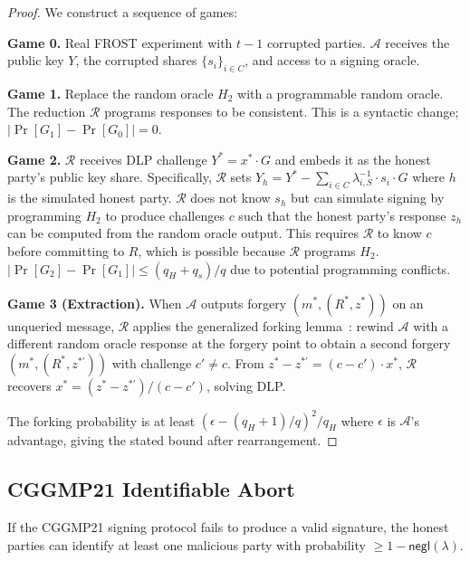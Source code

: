 \begin{proof}
We construct a sequence of games:

\textbf{Game 0.} Real FROST experiment with $t-1$ corrupted parties. $\mathcal{A}$
receives the public key $Y$, the corrupted shares $\{s_i\}_{i \in C}$, and access
to a signing oracle.

\textbf{Game 1.} Replace the random oracle $H_2$ with a programmable random oracle.
The reduction $\mathcal{R}$ programs responses to be consistent. This is a syntactic
change; $|\Pr[G_1] - \Pr[G_0]| = 0$.

\textbf{Game 2.} $\mathcal{R}$ receives DLP challenge $Y^* = x^* \cdot G$ and
embeds it as the honest party's public key share. Specifically, $\mathcal{R}$ sets
$Y_h = Y^* - \sum_{i \in C} \lambda_{i,S}^{-1} \cdot s_i \cdot G$ where $h$ is
the simulated honest party. $\mathcal{R}$ does not know $s_h$ but can simulate
signing by programming $H_2$ to produce challenges $c$ such that the honest party's
response $z_h$ can be computed from the random oracle output. This requires
$\mathcal{R}$ to know $c$ before committing to $R$, which is possible because
$\mathcal{R}$ programs $H_2$. $|\Pr[G_2] - \Pr[G_1]| \leq (q_H + q_s)/q$ due
to potential programming conflicts.

\textbf{Game 3 (Extraction).} When $\mathcal{A}$ outputs forgery $(m^*, (R^*, z^*))$
on an unqueried message, $\mathcal{R}$ applies the generalized forking
lemma~\cite{bellare2006}: rewind $\mathcal{A}$ with a different random oracle
response at the forgery point to obtain a second forgery $(m^*, (R^*, z^{*\prime}))$
with challenge $c' \neq c$. From $z^* - z^{*\prime} = (c - c') \cdot x^*$,
$\mathcal{R}$ recovers $x^* = (z^* - z^{*\prime}) / (c - c')$, solving DLP.

The forking probability is at least $(\epsilon - (q_H+1)/q)^2 / q_H$ where $\epsilon$
is $\mathcal{A}$'s advantage, giving the stated bound after rearrangement.
\end{proof}

\subsection{CGGMP21 Identifiable Abort}

\begin{theorem}
\label{thm:cggmp-ia}
If the CGGMP21 signing protocol fails to produce a valid signature, the honest parties
can identify at least one malicious party with probability $\geq 1 - \mathsf{negl}(\lambda)$.
\end{theorem}

